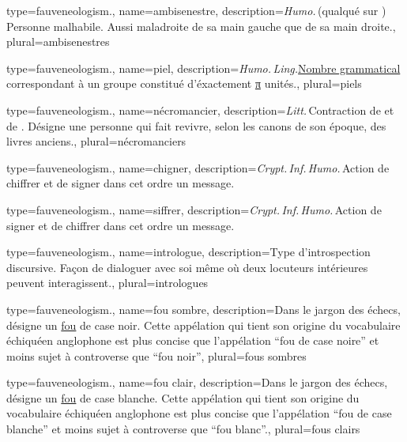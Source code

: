 {{
{
  type=fauveneologism.,
    name={ambisenestre},
    description={\emph{Humo.}\,(qualqué sur ) Personne malhabile. Aussi maladroite de sa main gauche que de sa main droite.},
    plural={ambisenestres}
}

{
  type=fauveneologism.,
    name={piel},
    description={\emph{Humo.\,Ling.}\’\href{https://fr.wikipedia.org/wiki/Nombre\_grammatical}{Nombre grammatical} correspondant à un groupe constitué d’éxactement \href{https://fr.wikipedia.org/wiki/Pi}{π} unités.},
    plural={piels}
}

{
  type=fauveneologism.,
    name={nécromancier},
    description={\emph{Litt.}\,Contraction de  et de . Désigne une personne qui fait revivre, selon les canons de son époque, des livres anciens.},
    plural={nécromanciers}
}

{
  type=fauveneologism.,
    name={chigner},
    description={\emph{Crypt.\,Inf.\,Humo.}\,Action de chiffrer et de signer dans cet ordre un message.}
}

{
  type=fauveneologism.,
    name={siffrer},
    description={\emph{Crypt.\,Inf.\,Humo.}\,Action de signer et de chiffrer dans cet ordre un message.}
}

{
  type=fauveneologism.,
    name={intrologue},
    description={Type d’introspection discursive. Façon de dialoguer avec soi même où deux locuteurs intérieures peuvent interagissent.},
    plural={intrologues}
}

{
  type=fauveneologism.,
    name={fou sombre},
    description={Dans le jargon des échecs, désigne un \href{https://fr.wikipedia.org/wiki/Fou\_(échecs)}{fou} de case noir. Cette appélation qui tient son origine du vocabulaire échiquéen anglophone est plus concise que l’appélation \enquote{fou de case noire} et moins sujet à controverse que \enquote{fou noir}},
    plural={fous sombres}
}

{
  type=fauveneologism.,
    name={fou clair},
    description={Dans le jargon des échecs, désigne un \href{https://fr.wikipedia.org/wiki/Fou\_(échecs)}{fou} de case blanche. Cette appélation qui tient son origine du vocabulaire échiquéen anglophone est plus concise que l’appélation \enquote{fou de case blanche} et moins sujet à controverse que \enquote{fou blanc}.},
    plural={fous clairs}
}

}}

